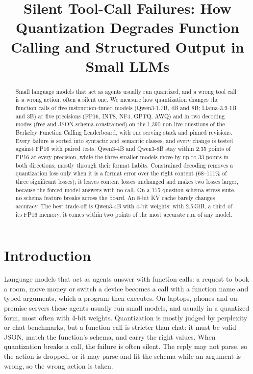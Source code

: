 \documentclass[conference]{IEEEtran}
\begin{document}
\title{Silent Tool-Call Failures: How Quantization Degrades Function Calling and Structured Output in Small LLMs}

\author{
}

\maketitle

\begin{abstract}
Small language models that act as agents usually run quantized, and a wrong tool call is a wrong action, often a
silent one. We measure how quantization changes the function calls of five instruction-tuned models (Qwen3-1.7B,
4B and 8B; Llama-3.2-1B and 3B) at five precisions (FP16, INT8, NF4, GPTQ, AWQ) and in two decoding modes (free
and JSON-schema-constrained) on the 1,390 non-live questions of the Berkeley Function Calling Leaderboard, with one
serving stack and pinned revisions. Every failure is sorted into syntactic and semantic classes, and every change
is tested against FP16 with paired tests. Qwen3-4B and Qwen3-8B stay within 2.35 points of FP16 at every
precision, while the three smaller models move by up to 33 points in both directions, mostly through their format
habits. Constrained decoding removes a quantization loss only when it is a format error over the right content
(68--111\% of three significant losses); it leaves content losses unchanged and makes two losses larger, because
the forced model answers with no call. On a 175-question schema-stress suite, no schema feature breaks across the
board. An 8-bit KV cache barely changes accuracy. The best trade-off is Qwen3-4B with 4-bit weights: with
2.5\,GiB, a third of its FP16 memory, it comes within two points of the most accurate run of any model.
\end{abstract}

\section{Introduction}
Language models that act as agents answer with function calls: a request to book a room, move money or switch a
device becomes a call with a function name and typed arguments, which a program then executes. On laptops, phones
and on-premise servers these agents usually run small models, and usually in a quantized form, most often with
4-bit weights. Quantization is mostly judged by perplexity or chat benchmarks, but a function call is stricter
than chat: it must be valid JSON, match the function's schema, and carry the right values. When quantization
breaks a call, the failure is often silent. The reply may not parse, so the action is dropped, or it may parse
and fit the schema while an argument is wrong, so the wrong action is taken.
\end{document}
